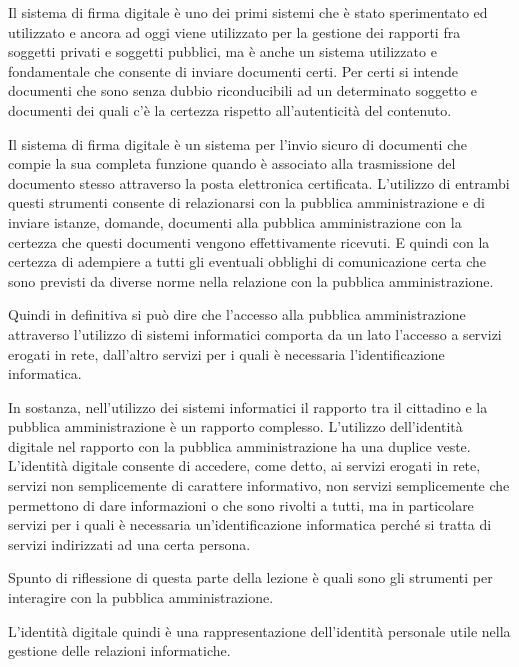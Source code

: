 Il sistema di firma digitale è uno dei primi sistemi che è stato sperimentato ed utilizzato e ancora ad oggi viene utilizzato per la gestione dei rapporti fra soggetti privati e soggetti pubblici, ma è anche un sistema utilizzato e fondamentale che consente di inviare documenti certi. Per certi si intende documenti che sono senza dubbio riconducibili ad un determinato soggetto e documenti dei quali c'è la certezza rispetto all'autenticità del contenuto.

Il sistema di firma digitale è un sistema per l'invio sicuro di documenti che compie la sua completa funzione quando è associato alla trasmissione del documento stesso attraverso la posta elettronica certificata. L'utilizzo di entrambi questi strumenti consente di relazionarsi con la pubblica amministrazione e di inviare istanze, domande, documenti alla pubblica amministrazione con la certezza che questi documenti vengono effettivamente ricevuti. E quindi con la certezza di adempiere a tutti gli eventuali obblighi di comunicazione certa che sono previsti da diverse norme nella relazione con la pubblica amministrazione.

Quindi in definitiva si può dire che l'accesso alla pubblica amministrazione attraverso l'utilizzo di sistemi informatici comporta da un lato l'accesso a servizi erogati in rete, dall'altro servizi per i quali è necessaria l'identificazione informatica. 

In sostanza, nell'utilizzo dei sistemi informatici il rapporto tra il cittadino e la pubblica amministrazione è un rapporto complesso. L'utilizzo dell'identità digitale nel rapporto con la pubblica amministrazione ha una duplice veste. L'identità digitale consente di accedere, come detto, ai servizi erogati in rete, servizi non semplicemente di carattere informativo, non servizi semplicemente che permettono di dare informazioni o che sono rivolti a tutti, ma in particolare servizi per i quali è necessaria un'identificazione informatica perché si tratta di servizi indirizzati ad una certa persona.

Spunto di riflessione di questa parte della lezione è quali sono gli strumenti per interagire con la pubblica amministrazione.

L'identità digitale quindi è una rappresentazione dell'identità personale utile nella gestione delle relazioni informatiche.
